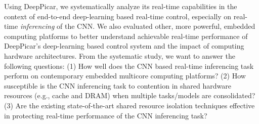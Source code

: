 
Using DeepPicar, we systematically analyze its real-time
capabilities in the context of end-to-end deep-learning based real-time
control, especially on real-time \emph{inferencing} of the CNN.
We also evaluated other, more powerful, embedded computing
platforms to better understand achievable real-time performance of
DeepPicar's deep-learning based control system and the impact of
computing hardware architectures.
From the systematic study, we want to answer the following questions:
(1) How well does the CNN based real-time inferencing task perform on
contemporary embedded multicore computing platforms? (2) How
susceptible is the CNN inferencing task to contention in shared
hardware resources (e.g., cache and DRAM) when multiple tasks/models
are consolidated? (3) Are the existing state-of-the-art shared resource
isolation techniques effective in protecting real-time performance of
the CNN inferencing task?


